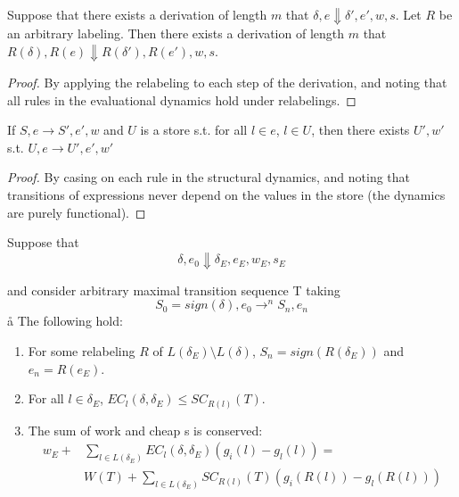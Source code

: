 \begin{lemma}
\label{relabeling_lemma}
Suppose that there exists a derivation of length $m$ that $\delta, e \Downarrow \delta', e', w, s$. Let $R$ be an arbitrary labeling. Then there exists a derivation of length $m$ that $R(\delta), R(e) \Downarrow R(\delta'), R(e'), w, s$.
\end{lemma}

\begin{proof}
By applying the relabeling to each step of the derivation, and noting that all rules in the evaluational dynamics hold under relabelings.
\end{proof}

\begin{lemma}
\label{stateless_lemma}
If $S, e \to S', e', w$ and $U$ is a store s.t. for all $l \in e$, $l \in U$, then there exists $U', w'$ s.t. $U, e \to U', e', w'$
\end{lemma}

\begin{proof}
By casing on each rule in the structural dynamics, and noting that transitions of expressions never depend on the values in the store (the dynamics are purely functional).
\end{proof}

\begin{theorem}
\label{main_work_theorem}
Suppose that 
$$\delta, e_0 \Downarrow \delta_E, e_E, w_E, s_E$$

and consider arbitrary maximal transition sequence T taking 
$$S_0 = sign(\delta), e_0 \to^n S_n, e_n$$
å
The following hold:
\begin{enumerate}
\item For some relabeling $R$ of $L(\delta_E) \setminus L(\delta)$, $S_n = sign(R(\delta_E))$ and $e_n = R(e_E)$.
\item For all $l \in \delta_E$, $EC_l(\delta, \delta_E) \leq SC_{R(l)}(T)$.
\item The sum of work and cheap \get{}s is conserved: \begin{align*}
w_E + &\sum_{l \in L(\delta_E)} EC_l(\delta, \delta_E) (g_i(l)-g_l(l)) =\\
 &W(T) + \sum_{l \in L(\delta_E)} SC_{R(l)}(T) (g_i(R(l)) - g_l(R(l)))
 \end{align*}
\end{enumerate}
\end{theorem}

